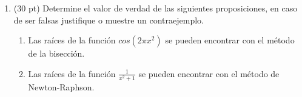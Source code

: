 \documentclass[11pt]{article}
\begin{document}
\begin{enumerate}
\item (30 pt) Determine el valor de verdad de las siguientes proposiciones, en caso de ser falsas justifique o muestre un contraejemplo.
\begin{enumerate}
\item
\fbox{ \begin{minipage}{1cm}   \hfill\vspace{1cm}   
    \end{minipage} } 
    \begin{minipage}{0.4\textwidth}
	Las ra\'ices de la funci\'on $cos(2\pi x^2)$ se pueden encontrar con el m\'etodo de la bisecci\'on.
    \end{minipage} 
    \begin{minipage}{0.4\textwidth}
   
    \end{minipage}
%
\item
\fbox{ \begin{minipage}{1cm}   \hfill\vspace{1cm}   		
    \end{minipage} } 
    \begin{minipage}{0.4\textwidth}
	Las ra\'ices de la funci\'on $\frac{1}{x^2+1}$ se pueden encontrar con el m\'etodo de Newton-Raphson.
    \end{minipage} 
    \begin{minipage}{0.4\textwidth}
    

\end{minipage}
\end{enumerate}
\end{enumerate}
\end{document}
